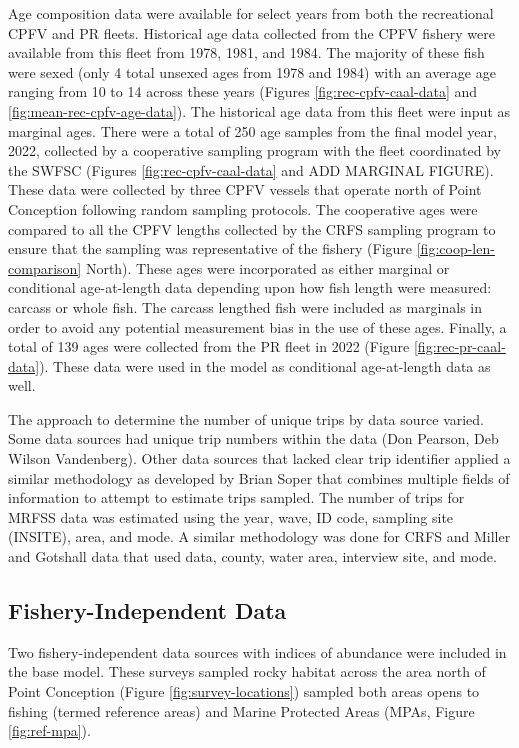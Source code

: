 \documentclass[11pt,
  english,
  letterpaper,
]{article}
\begin{document}
Age composition data were available for select years from both the recreational CPFV and PR fleets. Historical age data collected from the CPFV fishery were available from this fleet from 1978, 1981, and 1984. The majority of these fish were sexed (only 4 total unsexed ages from 1978 and 1984) with an average age ranging from 10 to 14 across these years (Figures \ref{fig:rec-cpfv-caal-data} and \ref{fig:mean-rec-cpfv-age-data}). The historical age data from this fleet were input as marginal ages. There were a total of 250 age samples from the final model year, 2022, collected by a cooperative sampling program with the fleet coordinated by the SWFSC (Figures \ref{fig:rec-cpfv-caal-data} and ADD MARGINAL FIGURE). These data were collected by three CPFV vessels that operate north of Point Conception following random sampling protocols. The cooperative ages were compared to all the CPFV lengths collected by the CRFS sampling program to ensure that the sampling was representative of the fishery (Figure \ref{fig:coop-len-comparison} North). These ages were incorporated as either marginal or conditional age-at-length data depending upon how fish length were measured: carcass or whole fish. The carcass lengthed fish were included as marginals in order to avoid any potential measurement bias in the use of these ages. Finally, a total of 139 ages were collected from the PR fleet in 2022 (Figure \ref{fig:rec-pr-caal-data}). These data were used in the model as conditional age-at-length data as well.

The approach to determine the number of unique trips by data source varied. Some data sources had unique trip numbers within the data (Don Pearson, Deb Wilson Vandenberg). Other data sources that lacked clear trip identifier applied a similar methodology as developed by Brian Soper that combines multiple fields of information to attempt to estimate trips sampled. The number of trips for MRFSS data was estimated using the year, wave, ID code, sampling site (INSITE), area, and mode. A similar methodology was done for CRFS and Miller and Gotshall data that used data, county, water area, interview site, and mode.

\hypertarget{fishery-independent-data}{%
\subsection{Fishery-Independent Data}\label{fishery-independent-data}}

Two fishery-independent data sources with indices of abundance were included in the base model. These surveys sampled rocky habitat across the area north of Point Conception (Figure \ref{fig:survey-locations}) sampled both areas opens to fishing (termed reference areas) and Marine Protected Areas (MPAs, Figure \ref{fig:ref-mpa}).
\end{document}
